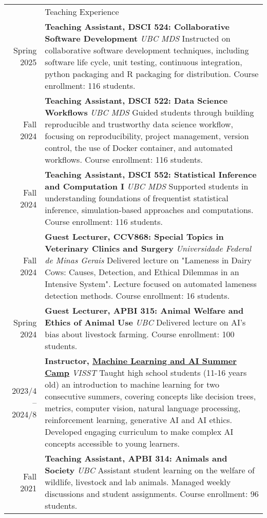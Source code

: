 \documentclass[letterpaper, 11pt]{article}
\newcommand{\headingfont}{\Large\color{OliveGreen}}
\newenvironment{SectionTable}[1]{
	\renewcommand*{\arraystretch}{1.7}
	\setlength{\tabcolsep}{10pt}
	\begin{longtable}{Rp{5.2in}} & #1 \\}
{\end{longtable}\vspace{-.3cm}}
\begin{document}
\begin{SectionTable}{\headingfont Teaching Experience}
Spring 2025 & 
\textbf{Teaching Assistant, DSCI 524: Collaborative Software Development} \newline
\textit{UBC MDS} \newline
Instructed on collaborative software development techniques, including software life cycle, unit testing, continuous integration, python packaging and R packaging for distribution. Course enrollment: 116 students. \\
Fall 2024 & 
\textbf{Teaching Assistant, DSCI 522: Data Science Workflows} \newline
\textit{UBC MDS} \newline
Guided students through building reproducible and trustworthy data science workflow, focusing on reproducibility, project management, version control, the use of Docker container, and automated workflows. Course enrollment: 116 students. \\
Fall 2024 & 
\textbf{Teaching Assistant, DSCI 552: Statistical Inference and Computation I} \newline
\textit{UBC MDS} \newline
Supported students in understanding foundations of frequentist statistical inference, simulation-based approaches and  computations. Course enrollment: 116 students. \\
Fall 2024 & 
\textbf{Guest Lecturer, CCV868: Special Topics in Veterinary Clinics and Surgery} \newline
\textit{Universidade Federal de Minas Gerais} \newline
Delivered lecture on "Lameness in Dairy Cows: Causes, Detection, and Ethical Dilemmas in an Intensive System". Lecture focused on automated lameness detection methods. Course enrollment: 16 students. \\
Spring 2024 & 
\textbf{Guest Lecturer, APBI 315: Animal Welfare and Ethics of Animal Use} \newline
\textit{UBC} \newline
Delivered lecture on AI's bias about livestock farming. Course enrollment: 100 students. \\
2023/4 -- 2024/8 &
\textbf{Instructor, \href{https://www.visst.ca/past-camps/machinelearningsummer}{Machine Learning and AI Summer Camp}} \newline
\textit{VISST} \newline
Taught high school students (11-16 years old) an introduction to machine learning for two consecutive summers, covering concepts like decision trees, metrics, computer vision, natural language processing, reinforcement learning, generative AI and AI ethics. Developed engaging curriculum to make complex AI concepts accessible to young learners. \\
Fall 2021 & 
\textbf{Teaching Assistant, APBI 314: Animals and Society} \newline
\textit{UBC} \newline
Assistant student learning on the welfare of wildlife, livestock and lab animals. Managed weekly discussions and student assignments. Course enrollment: 96 students.
\end{SectionTable}
\end{document}
